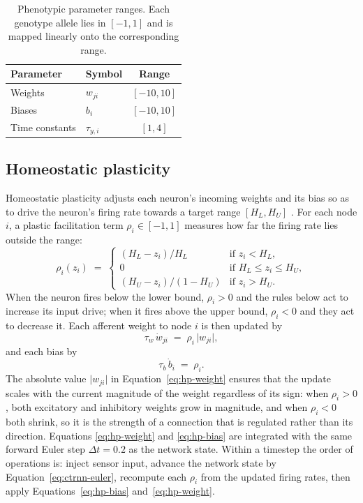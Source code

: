 \begin{table}[t]
  \centering
  \caption{Phenotypic parameter ranges. Each genotype allele lies in $[-1,1]$
  and is mapped linearly onto the corresponding range.}
  \label{tab:param-ranges}
  \begin{tabular}{llc}
    \toprule
    Parameter & Symbol & Range \\
    \midrule
    Weights        & $w_{ji}$    & $[-10, 10]$ \\
    Biases         & $b_i$       & $[-10, 10]$ \\
    Time constants & $\tau_{y,i}$ & $[1, 4]$ \\
    \bottomrule
  \end{tabular}
\end{table}

\subsection{Homeostatic plasticity}
\label{sec:methods:hp}

Homeostatic plasticity adjusts each neuron's incoming weights and its bias so as
to drive the neuron's firing rate towards a target range $[H_L, H_U]$
\parencite{dipaolo2000, williams2006}. For each node $i$, a plastic facilitation
term $\rho_i \in [-1, 1]$ measures how far the firing rate lies outside the
range:
%
\begin{equation}
  \rho_i(z_i) \;=\;
  \begin{cases}
    (H_L - z_i)/H_L & \text{if } z_i < H_L, \\[2pt]
    0 & \text{if } H_L \le z_i \le H_U, \\[2pt]
    (H_U - z_i)/(1 - H_U) & \text{if } z_i > H_U.
  \end{cases}
  \label{eq:rho}
\end{equation}
%
When the neuron fires below the lower bound, $\rho_i > 0$ and the rules below act
to increase its input drive; when it fires above the upper bound, $\rho_i < 0$
and they act to decrease it. Each afferent weight to node $i$ is then updated by
%
\begin{equation}
  \tau_w\, \dot{w}_{ji} \;=\; \rho_i\, \lvert w_{ji} \rvert,
  \label{eq:hp-weight}
\end{equation}
%
and each bias by
%
\begin{equation}
  \tau_b\, \dot{b}_i \;=\; \rho_i.
  \label{eq:hp-bias}
\end{equation}
%
The absolute value $\lvert w_{ji} \rvert$ in Equation~\ref{eq:hp-weight} ensures
that the update scales with the current magnitude of the weight regardless of its
sign: when $\rho_i > 0$, both excitatory and inhibitory weights grow in magnitude,
and when $\rho_i < 0$ both shrink, so it is the strength of a connection that is
regulated rather than its direction. Equations
\ref{eq:hp-weight} and \ref{eq:hp-bias} are integrated with the same forward
Euler step $\Delta t = 0.2$ as the network state. Within a timestep the order of
operations is: inject sensor input, advance the network state by
Equation~\ref{eq:ctrnn-euler}, recompute each $\rho_i$ from the updated firing
rates, then apply Equations~\ref{eq:hp-bias} and~\ref{eq:hp-weight}.

